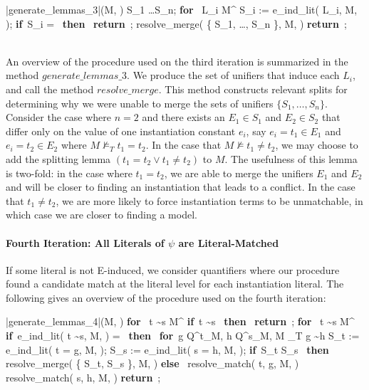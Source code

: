 \documentclass{llncs}
\def\IF{\qtab\keyword{if}\ }
\def\THEN{\ \keyword{then}\ }
\def\ELSE{\untab\qtab\keyword{else}\ }
\def\FI{\untab}
\def\RETURN{\keyword{return}\ }
\def\ENDPROC{\untab}
\def\DOFOR{\qtab\keyword{for}\ }
\def\ENDFOR{\untab}
\def\keyword#1{\mbox{\normalshape\bf #1}}
\begin{document}
\begin{minipage}[t]{.4\linewidth}
\begin{program}
\PROC |generate\_lemmas\_3|(M, \psi) \BODY
  S_1 \ldots S_n;
  \DOFOR {} L_i \in M^\psi
    S_i := e\_ind\_lit( L_i, M, \psi );
    \IF S_i = \emptyset \THEN
      \RETURN;
    \FI
  \ENDFOR
  resolve\_merge( \{ S_1, \ldots, S_n \}, M, \psi )
  \RETURN;
\ENDPROC
\end{program}
\end{minipage}

\ \\

An overview of the procedure used on the third iteration is summarized in the method $generate\_lemmas\_3$.
We produce the set of unifiers that induce each $L_i$, and call the method $resolve\_merge$.
This method constructs relevant splits for determining why we were unable to merge the sets of unifiers $\{ S_1, \ldots, S_n \}$.
Consider the case where $n = 2$ and there exists an $E_1 \in S_1$ and $E_2 \in S_2$ that differ only on the value of one instantiation constant $e_i$, say $e_i = t_1 \in E_1$ and $e_i = t_2 \in E_2$ where $M \not\models_T t_1 = t_2$.
In the case that $M \not\models t_1 \neq t_2$, we may choose to add the splitting lemma $( t_1 = t_2 \vee t_1 \neq t_2 )$ to $M$.
The usefulness of this lemma is two-fold: in the case where $t_1 = t_2$, we are able to merge the unifiers $E_1$ and $E_2$ and will be closer to finding an instantiation that leads to a conflict.
In the case that $t_1 \neq t_2$, we are more likely to force instantiation terms to be unmatchable, in which case we are closer to finding a model.

\paragraph{Fourth Iteration: All Literals of $\psi$ are Literal-Matched}

If some literal is not E-induced, we consider quantifiers where our procedure found a candidate match at the literal level for each instantiation literal.
The following gives an overview of the procedure used on the fourth iteration:

\begin{minipage}[t]{.4\linewidth}
\begin{program}
\PROC |generate\_lemmas\_4|(M, \psi) \BODY
  \DOFOR {} t \sim s \in M^\psi
    \IF t \sim s  \THEN
      \RETURN;
    \FI
  \ENDFOR
  \DOFOR {} t \sim s \in M^\psi
    \IF e\_ind\_lit( t \sim s, M, \psi ) = \emptyset \THEN
      \DOFOR g \in Q^t_M, h \in Q^s_M,  M \models_T g \sim h
      	S_t := e\_ind\_lit( t = g, M, \psi );
      	S_s := e\_ind\_lit( s = h, M, \psi );
        \IF S_t \neq \emptyset {} S_s \neq \emptyset \THEN
      	  resolve\_merge( \{ S_t, S_s \}, M, \psi )
      	\ELSE	
      	  resolve\_match( t, g, M, \psi )
     	  resolve\_match( s, h, M, \psi )
     	\FI
      \ENDFOR
    \FI
  \ENDFOR
  \RETURN;
\ENDPROC
\end{program}
\end{minipage}
\end{document}

